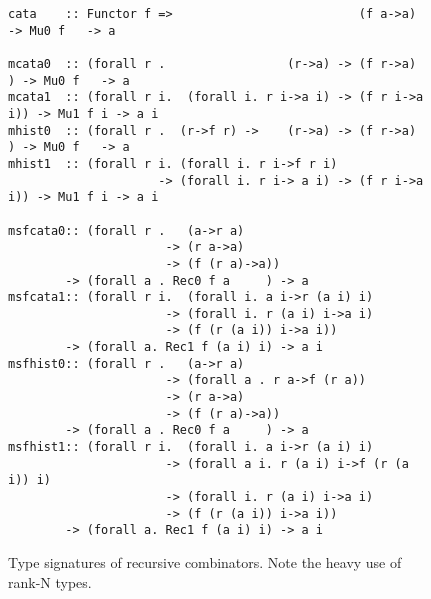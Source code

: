\documentclass[letterpaper,12pt]{article}
\begin{document}
\begin{figure}\small
\begin{verbatim}
cata    :: Functor f =>                          (f a->a)      -> Mu0 f   -> a

mcata0  :: (forall r .                 (r->a) -> (f r->a)    ) -> Mu0 f   -> a
mcata1  :: (forall r i.  (forall i. r i->a i) -> (f r i->a i)) -> Mu1 f i -> a i
mhist0  :: (forall r .  (r->f r) ->    (r->a) -> (f r->a)    ) -> Mu0 f   -> a
mhist1  :: (forall r i. (forall i. r i->f r i)
                     -> (forall i. r i-> a i) -> (f r i->a i)) -> Mu1 f i -> a i

msfcata0:: (forall r .   (a->r a)
                      -> (r a->a)
                      -> (f (r a)->a))
        -> (forall a . Rec0 f a     ) -> a
msfcata1:: (forall r i.  (forall i. a i->r (a i) i)
                      -> (forall i. r (a i) i->a i)
                      -> (f (r (a i)) i->a i))
        -> (forall a. Rec1 f (a i) i) -> a i
msfhist0:: (forall r .   (a->r a)
                      -> (forall a . r a->f (r a))
                      -> (r a->a)
                      -> (f (r a)->a))
        -> (forall a . Rec0 f a     ) -> a
msfhist1:: (forall r i.  (forall i. a i->r (a i) i)
                      -> (forall a i. r (a i) i->f (r (a i)) i)
                      -> (forall i. r (a i) i->a i)
                      -> (f (r (a i)) i->a i))
        -> (forall a. Rec1 f (a i) i) -> a i
\end{verbatim}
\caption{Type signatures of recursive combinators.
         Note the heavy use of rank-N types.}
\label{fig:rcombty}
\end{figure}
\end{document}
